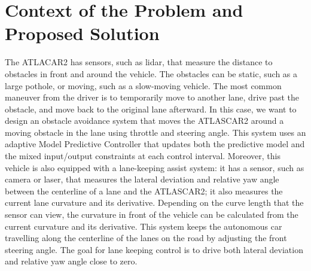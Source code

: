 \documentclass[conference, 11pt]{IEEEtran}
\begin{document}
\section{Context of the Problem and \\  Proposed Solution}
The ATLACAR2 has sensors, such as lidar, that measure the distance to obstacles in front and around the vehicle. The obstacles can be static, such as a large pothole, or moving, such as a slow-moving vehicle. The most common maneuver from the driver is to temporarily move to another lane, drive past the obstacle, and move back to the original lane afterward. In this case, we want to design an obstacle avoidance system that moves the ATLASCAR2 around a moving obstacle in the lane using throttle and steering angle. This system uses an adaptive Model Predictive Controller that updates both the predictive model and the mixed input/output constraints at each control interval. Moreover, this vehicle is also equipped with a lane-keeping assist system: it has a sensor, such as camera or laser, that measures the lateral deviation and relative yaw angle between the centerline of a lane and the ATLASCAR2; it also measures the current lane curvature and its derivative. Depending on the curve length that the sensor can view, the curvature in front of the vehicle can be calculated from the current curvature and its derivative. This system keeps the autonomous car travelling along the centerline of the lanes on the road by adjusting the front steering angle. The goal for lane keeping control is to drive both lateral deviation and relative yaw angle close to zero.
\end{document}
